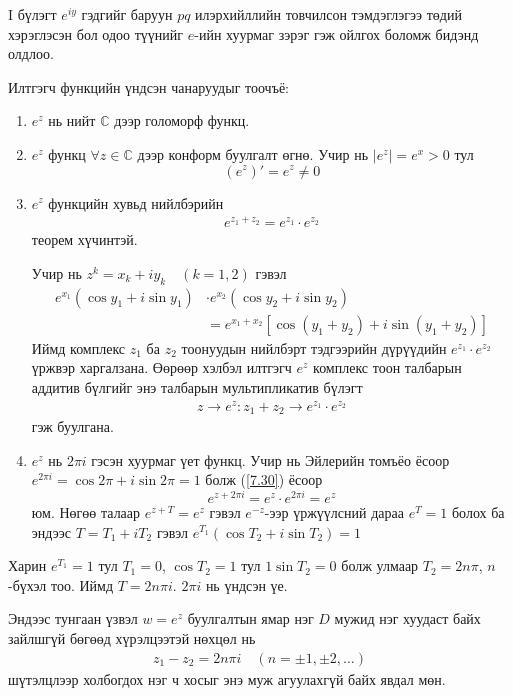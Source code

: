 I бүлэгт $e^{iy}$ гэдгийг баруун $pq$ илэрхийллийн товчилсон тэмдэглэгээ төдий хэрэглэсэн бол одоо түүнийг $e$-ийн хуурмаг зэрэг гэж ойлгох боломж бидэнд олдлоо.

Илтгэгч функцийн үндсэн чанаруудыг тоочъё:
\begin{enumerate}
    \item [$1^\circ.$] $e^z$ нь нийт $\mathbb{C}$ дээр голоморф функц.
    \item [$2^\circ.$] $e^z$ функц $\forall z\in\mathbb{C}$ дээр конформ буулгалт өгнө. Учир нь $|e^z|=e^x>0$ тул
    $$(e^z)'=e^z\neq 0$$
     \item [$3^\circ.$] $e^z$ функцийн хувьд нийлбэрийн
     \begin{eqnarray} \label{7.30}
     e^{z_1+z_2}=e^{z_1}\cdot e^{z_2}
     \end{eqnarray}
     теорем хүчинтэй.
     
Учир нь $z^k=x_k+iy_k \quad (k=1,2)$ гэвэл
\begin{align*}
    e^{x_1}(\cos y_1+i\sin y_1)&\cdot e^{x_2}(\cos y_2+i\sin y_2)\\
    &=e^{x_1+x_2}[\cos(y_1+y_2)+i\sin (y_1+y_2)]
\end{align*}
Иймд комплекс $z_1$ ба $z_2$ тоонуудын нийлбэрт тэдгээрийн дүрүүдийн $e^{z_1}\cdot e^{z_2}$ үржвэр харгалзана. Өөрөөр хэлбэл илтгэгч $e^z$ комплекс тоон талбарын аддитив бүлгийг энэ талбарын мультипликатив бүлэгт
\begin{eqnarray}
z\rightarrow e^z:z_1+z_2\rightarrow e^{z_1}\cdot e^{z_2}
\end{eqnarray}
гэж буулгана.
 \item [$4^\circ.$]  $e^z$ нь $2\pi i$ гэсэн хуурмаг үет функц. Учир нь Эйлерийн томъёо ёсоор $e^{2\pi i}=\cos 2\pi +i\sin 2\pi =1$ болж (\ref{7.30}) ёсоор
 $$e^{z+2\pi i}=e^z\cdot e^{2\pi i}=e^z$$
 юм. Нөгөө талаар $e^{z+T}=e^z$ гэвэл $e^{-z}$-ээр үржүүлсний дараа $e^T=1$ болох ба эндээс $T=T_1+iT_2$ гэвэл $e^{T_1}(\cos T_2+i\sin T_2)=1$
\end{enumerate}
 Харин $e^{T_1}=1$ тул $T_1=0$, $\cos T_2=1$ тул $1\sin T_2=0$ болж улмаар $T_2=2n \pi$, $n$-бүхэл тоо. Иймд $T=2n \pi i$. $2\pi i$ нь үндсэн үе.
    
Эндээс тунгаан үзвэл $w=e^z$ буулгалтын ямар нэг $D$ мужид нэг хуудаст байх зайлшгүй бөгөөд хүрэлцээтэй нөхцөл нь
 \begin{eqnarray} \label{7.32}
    z_1-z_2=2n \pi i \quad (n=\pm 1, \pm 2, \ldots)
    \end{eqnarray}
    шүтэлцлээр холбогдох нэг ч хосыг энэ муж агуулахгүй байх явдал мөн.
    
